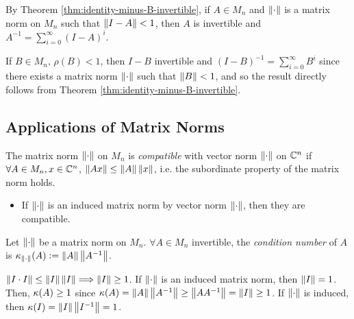 \begin{note*}
By Theorem \ref{thm:identity-minus-B-invertible}, if $A\in M_n$ and $\left\lVert\cdot\right\rVert$ is a matrix norm on $M_n$ such that $\left\lVert I-A\right\rVert < 1$, then $A$ is invertible and $A^{-1} = \sum_{i=0}^\infty (I-A)^i$.
\end{note*}

\begin{note*}
If $B \in M_n$, $\rho(B) < 1$, then $I-B$ invertible and $(I-B)^{-1} = \sum_{i=0}^\infty B^i$ since there exists a matrix norm $\left\lVert\cdot\right\rVert$ such that $\left\lVert B\right\rVert < 1$, and so the result directly follows from Theorem \ref{thm:identity-minus-B-invertible}.
\end{note*}

\subsection{Applications of Matrix Norms}
\begin{definition}[Compatibility]
\label{def:compatibility}
The matrix norm $\left\lVert\cdot\right\rVert$ on $M_n$ is \textit{compatible} with vector norm $\left\lVert\cdot\right\rVert$ on $\mathbb C^n$ if $\forall A \in M_n, x \in \mathbb C^n$, $\left\lVert Ax\right\rVert \le \left\lVert A\right\rVert\left\lVert x\right\rVert$, i.e. the subordinate property of the matrix norm holds.
\begin{itemize}
    \item If $\left\lVert\cdot\right\rVert$ is an induced matrix norm by vector norm $\left\lVert\cdot\right\rVert$, then they are compatible.
\end{itemize}
\end{definition}

\begin{definition}
\label{def:condition-number}
Let $\left\lVert\cdot\right\rVert$ be a matrix norm on $M_n$. $\forall A \in M_n$ invertible, the \textit{condition number} of $A$ is $\kappa_{\left\lVert\cdot\right\rVert}(A) \vcentcolon= \left\lVert A\right\rVert\left\lVert A^{-1}\right\rVert$.
\end{definition}

\begin{note*}
$\left\lVert I\cdot I\right\rVert \le \left\lVert I\right\rVert\left\lVert I\right\rVert \Longrightarrow \left\lVert I\right\rVert \ge 1$. If $\left\lVert\cdot\right\rVert$ is an induced matrix norm, then $\left\lVert I\right\rVert = 1$. Then, $\kappa(A) \ge 1$ since $\kappa(A) = \left\lVert A\right\rVert\left\lVert A^{-1}\right\rVert \ge \left\lVert AA^{-1}\right\rVert = \left\lVert I\right\rVert \ge 1$. If $\left\lVert\cdot\right\rVert$ is induced, then $\kappa(I) = \left\lVert I\right\rVert\left\lVert I^{-1}\right\rVert = 1$.
\end{note*}

